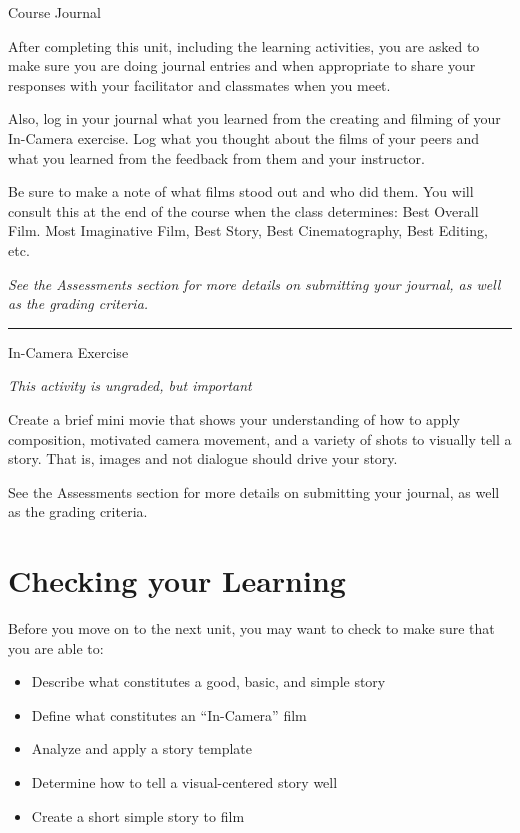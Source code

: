\documentclass[
]{book}
\providecommand{\tightlist}{%
  \setlength{\itemsep}{0pt}\setlength{\parskip}{0pt}}
\begin{document}
\begin{assessment}
{Course Journal}

After completing this unit, including the learning activities, you are asked to make sure you are doing journal entries and when appropriate to share your responses with your facilitator and classmates when you meet.

Also, log in your journal what you learned from the creating and filming of your In-Camera exercise. Log what you thought about the films of your peers and what you learned from the feedback from them and your instructor.

Be sure to make a note of what films stood out and who did them. You will consult this at the end of the course when the class determines: Best Overall Film. Most Imaginative Film, Best Story, Best Cinematography, Best Editing, etc.

\emph{See the Assessments section for more details on submitting your journal, as well as the grading criteria.}

\begin{center}\rule{0.5\linewidth}{0.5pt}\end{center}

{In-Camera Exercise}

\emph{This activity is ungraded, but important}

Create a brief mini movie that shows your understanding of how to apply composition, motivated camera movement, and a variety of shots to visually tell a story. That is, images and not dialogue should drive your story.

See the Assessments section for more details on submitting your journal, as well as the grading criteria.
\end{assessment}

\hypertarget{checking-your-learning-5}{%
\section*{Checking your Learning}\label{checking-your-learning-5}}

\begin{progress}
Before you move on to the next unit, you may want to check to make sure that you are able to:

\begin{itemize}
\tightlist
\item
  Describe what constitutes a good, basic, and simple story\\
\item
  Define what constitutes an ``In-Camera'' film\\
\item
  Analyze and apply a story template\\
\item
  Determine how to tell a visual-centered story well\\
\item
  Create a short simple story to film
\end{itemize}
\end{progress}
\end{document}

